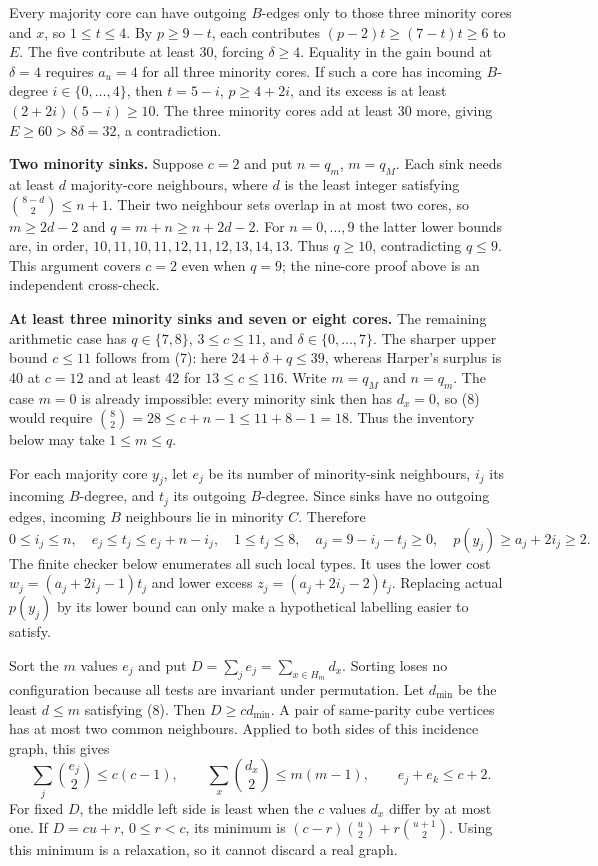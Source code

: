 \documentclass[11pt,a4paper]{article}
\begin{document}
Every majority core can have outgoing \(B\)-edges only to those three minority cores and \(x\), so \(1\le t\le4\). By \(p\ge9-t\), each contributes \((p-2)t\ge(7-t)t\ge6\) to \(E\). The five contribute at least 30, forcing \(\delta\ge4\). Equality in the gain bound at \(\delta=4\) requires \(a_u=4\) for all three minority cores. If such a core has incoming \(B\)-degree \(i\in\{0,\ldots,4\}\), then \(t=5-i\), \(p\ge4+2i\), and its excess is at least \((2+2i)(5-i)\ge10\). The three minority cores add at least 30 more, giving \(E\ge60>8\delta=32\), a contradiction.

\textbf{Two minority sinks.} Suppose \(c=2\) and put \(n=q_m\), \(m=q_M\). Each sink needs at least \(d\) majority-core neighbours, where \(d\) is the least integer satisfying \(\binom{8-d}{2}\le n+1\). Their two neighbour sets overlap in at most two cores, so \(m\ge2d-2\) and \(q=m+n\ge n+2d-2\). For \(n=0,\ldots,9\) the latter lower bounds are, in order, \(10,11,10,11,12,11,12,13,14,13\). Thus \(q\ge10\), contradicting \(q\le9\). This argument covers \(c=2\) even when \(q=9\); the nine-core proof above is an independent cross-check.

\textbf{At least three minority sinks and seven or eight cores.} The remaining arithmetic case has \(q\in\{7,8\}\), \(3\le c\le11\), and \(\delta\in\{0,\ldots,7\}\). The sharper upper bound \(c\le11\) follows from (7): here \(24+\delta+q\le39\), whereas Harper's surplus is 40 at \(c=12\) and at least 42 for \(13\le c\le116\). Write \(m=q_M\) and \(n=q_m\). The case \(m=0\) is already impossible: every minority sink then has \(d_x=0\), so (8) would require \(\binom82=28\le c+n-1\le11+8-1=18\). Thus the inventory below may take \(1\le m\le q\).

For each majority core \(y_j\), let \(e_j\) be its number of minority-sink neighbours, \(i_j\) its incoming \(B\)-degree, and \(t_j\) its outgoing \(B\)-degree. Since sinks have no outgoing edges, incoming \(B\) neighbours lie in minority \(C\). Therefore
\[
0\le i_j\le n,\quad e_j\le t_j\le e_j+n-i_j,\quad
1\le t_j\le8,\quad a_j=9-i_j-t_j\ge0,\quad
p(y_j)\ge a_j+2i_j\ge2. \tag{11}
\]
The finite checker below enumerates all such local types. It uses the lower cost \(w_j=(a_j+2i_j-1)t_j\) and lower excess \(z_j=(a_j+2i_j-2)t_j\). Replacing actual \(p(y_j)\) by its lower bound can only make a hypothetical labelling easier to satisfy.

Sort the \(m\) values \(e_j\) and put \(D=\sum_j e_j=\sum_{x\in H_m}d_x\). Sorting loses no configuration because all tests are invariant under permutation. Let \(d_{\min}\) be the least \(d\le m\) satisfying (8). Then \(D\ge c d_{\min}\). A pair of same-parity cube vertices has at most two common neighbours. Applied to both sides of this incidence graph, this gives
\[
\sum_j\binom{e_j}{2}\le c(c-1),\qquad
\sum_x\binom{d_x}{2}\le m(m-1),\qquad
e_j+e_k\le c+2. \tag{12}
\]
For fixed \(D\), the middle left side is least when the \(c\) values \(d_x\) differ by at most one. If \(D=cu+r\), \(0\le r<c\), its minimum is \((c-r)\binom{u}{2}+r\binom{u+1}{2}\). Using this minimum is a relaxation, so it cannot discard a real graph.
\end{document}
